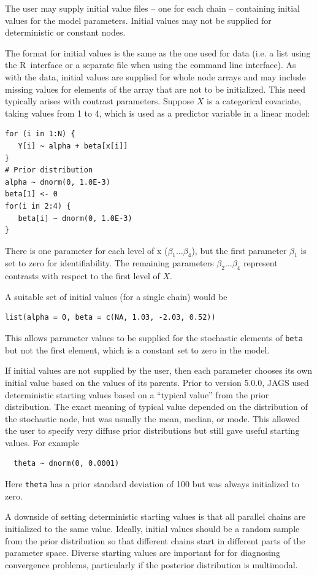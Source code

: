 \documentclass[11pt, a4paper, titlepage]{report}
\newcommand{\R}{\textsf{R}}
\begin{document}
The user may supply initial value files -- one for each chain --
containing initial values for the model parameters. Initial values may
not be supplied for deterministic or constant nodes.

The format for initial values is the same as the one used for data
(i.e. a list using the \R\ interface or a separate file when using the
command line interface). As with the data, initial values are supplied
for whole node arrays and may include missing values for elements of
the array that are not to be initialized.  This need typically arises
with contrast parameters.  Suppose $X$ is a categorical covariate,
taking values from 1 to 4, which is used as a predictor variable in a
linear model:
\begin{verbatim}
for (i in 1:N) {
   Y[i] ~ alpha + beta[x[i]]
}
# Prior distribution
alpha ~ dnorm(0, 1.0E-3)
beta[1] <- 0
for(i in 2:4) {
   beta[i] ~ dnorm(0, 1.0E-3)
}
\end{verbatim}
There is one parameter for each level of x ($\beta_1 \ldots \beta_4$),
but the first parameter $\beta_1$ is set to zero for
identifiability. The remaining parameters $\beta_2 \ldots \beta_4$
represent contrasts with respect to the first level of $X$.

A suitable set of initial values (for a single chain) would be
\begin{verbatim}
list(alpha = 0, beta = c(NA, 1.03, -2.03, 0.52))
\end{verbatim}
This allows parameter values to be supplied for the stochastic
elements of \verb+beta+ but not the first element, which is a
constant set to zero in the model.

If initial values are not supplied by the user, then each parameter
chooses its own initial value based on the values of its
parents. Prior to version 5.0.0, JAGS used deterministic starting
values based on a ``typical value'' from the prior distribution. The
exact meaning of typical value depended on the distribution of the
stochastic node, but was usually the mean, median, or mode. This
allowed the user to specify very diffuse prior distributions but still
gave useful starting values. For example
\begin{verbatim}
  theta ~ dnorm(0, 0.0001)
\end{verbatim}
Here \texttt{theta} has a prior standard deviation of 100 but was
always initialized to zero.

A downside of setting deterministic starting values is that all
parallel chains are initialized to the same value. Ideally, initial
values should be a random sample from the prior distribution so that
different chains start in different parts of the parameter
space. Diverse starting values are important for for diagnosing
convergence problems, particularly if the posterior distribution is
multimodal.
\end{document}
